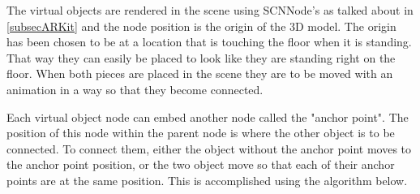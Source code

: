 The virtual objects are rendered in the scene using SCNNode's as talked about in \ref{subsecARKit} and the node position is the origin of the 3D model. The origin has been chosen to be at a location that is touching the floor when it is standing. That way they can easily be placed to look like they are standing right on the floor.
When both pieces are placed in the scene they are to be moved with an animation in a way so that they become connected.

Each virtual object node can embed another node called the "anchor point". The position of this node within the parent node is where the other object is to be connected. To connect them, either the object without the anchor point moves to the anchor point position, or the two object move so that each of their anchor points are at the same position.
This is accomplished using the algorithm below.

